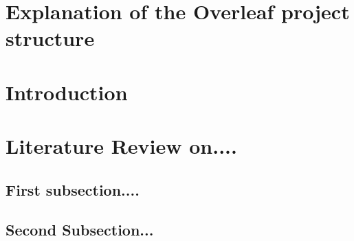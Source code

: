 \documentclass[12pt]{article}
\begin{document}


%
\begin{spacing}{1.5}
\newpage
{}
\setcounter{page}{1}
\tableofcontents

\newpage
\printglossary[type=\acronymtype, title= List of Abbreviations, toctitle=List of Abbreviations]

\newpage
\listoffigures
\listoftables




\newpage
{}
\setcounter{page}{1}
\section{Explanation of the Overleaf project structure}  %

\bigskip


\newpage
{}
\setcounter{page}{1}
\section{Introduction}  %

\bigskip


\newpage
\section{Literature Review on....} %

\subsection{First subsection....}

\subsection{Second Subsection...}


\newpage
\end{spacing}
\begin{spacing}{1}
\end{spacing}
\end{document}

